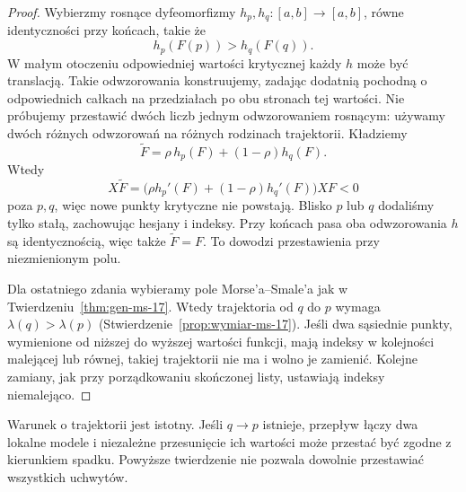 \begin{proof}
Wybierzmy rosnące dyfeomorfizmy $h_p,h_q:[a,b]\to[a,b]$,
równe identyczności przy końcach, takie że
\[
 h_p(F(p))>h_q(F(q)).
\]
W małym otoczeniu odpowiedniej wartości krytycznej
każdy $h$ może być translacją. Takie odwzorowania konstruujemy,
zadając dodatnią pochodną o odpowiednich całkach
na przedziałach po obu stronach tej wartości.
Nie próbujemy przestawić dwóch liczb jednym odwzorowaniem rosnącym:
używamy dwóch różnych odwzorowań na różnych rodzinach trajektorii.
Kładziemy
\[
 \widetilde F=\rho\,h_p(F)+(1-\rho)h_q(F).
\]
Wtedy
\[
 X\widetilde F=
 \bigl(\rho h_p'(F)+(1-\rho)h_q'(F)\bigr)XF<0
\]
poza $p,q$, więc nowe punkty krytyczne nie powstają.
Blisko $p$ lub $q$ dodaliśmy tylko stałą,
zachowując hesjany i indeksy. Przy końcach pasa
oba odwzorowania $h$ są identycznością, więc także $\widetilde F=F$.
To dowodzi przestawienia przy niezmienionym polu.

Dla ostatniego zdania wybieramy
pole Morse'a--Smale'a jak w
Twierdzeniu~\ref{thm:gen-ms-17}.
Wtedy trajektoria od $q$ do $p$
wymaga $\lambda(q)>\lambda(p)$
(Stwierdzenie~\ref{prop:wymiar-ms-17}).
Jeśli dwa sąsiednie punkty, wymienione od niższej
do wyższej wartości funkcji, mają indeksy
w kolejności malejącej lub równej,
takiej trajektorii nie ma i wolno je
zamienić. Kolejne zamiany, jak przy
porządkowaniu skończonej listy, ustawiają
indeksy niemalejąco.
\end{proof}

\begin{uwaga}
Warunek o trajektorii jest istotny.
Jeśli $q\to p$ istnieje, przepływ
łączy dwa lokalne modele i niezależne
przesunięcie ich wartości może
przestać być zgodne z kierunkiem
spadku. Powyższe twierdzenie nie
pozwala dowolnie przestawiać wszystkich
uchwytów.
\end{uwaga}

